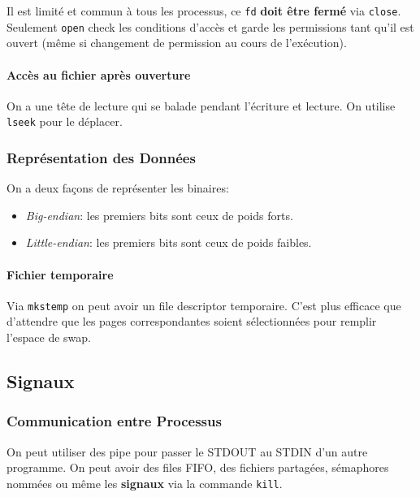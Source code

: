 Il est limité et commun à tous les processus, ce \texttt{fd}
\textbf{doit être fermé} via \texttt{close}. Seulement \texttt{open}
check les conditions d'accès et garde les permissions tant qu'il est
ouvert (même si changement de permission au cours de l'exécution).

\paragraph{Accès au fichier après
ouverture}\label{accuxe8s-au-fichier-apruxe8s-ouverture}

On a une tête de lecture qui se balade pendant l'écriture et lecture. On
utilise \texttt{lseek} pour le déplacer.

\subsubsection{Représentation des
Données}\label{repruxe9sentation-des-donnuxe9es}

On a deux façons de représenter les binaires:

\begin{itemize}
\tightlist
\item
  \emph{Big-endian}: les premiers bits sont ceux de poids forts.
\item
  \emph{Little-endian}: les premiers bits sont ceux de poids faibles.
\end{itemize}

\paragraph{Fichier temporaire}\label{fichier-temporaire}

Via \texttt{mkstemp} on peut avoir un file descriptor temporaire. C'est
plus efficace que d'attendre que les pages correspondantes soient
sélectionnées pour remplir l'espace de swap.

\subsection{Signaux}\label{signaux}

\subsubsection{Communication entre
Processus}\label{communication-entre-processus}

On peut utiliser des pipe \texttt{\textbar{}} pour passer le STDOUT au
STDIN d'un autre programme. On peut avoir des files FIFO, des fichiers
partagées, sémaphores nommées ou même les \textbf{signaux} via la
commande \texttt{kill}.

